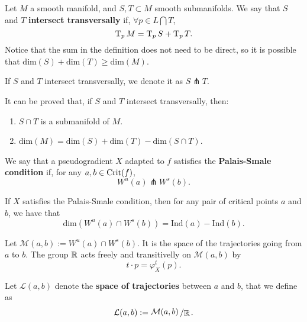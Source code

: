 \begin{deff}
Let $M$ a smooth manifold, and $S, T \subset M$ smooth submanifolds. We say that $S$ and $T$ {\bf intersect transversally} if, $\forall p \in L \bigcap T$,
$$\operatorname T_pM = \operatorname T_pS + \operatorname T_pT .$$
Notice that the sum in the definition does not need to be direct, so it is possible that $\text{dim}(S)+\text{dim}(T) \geq \text{dim}(M)$.

If $S$ and $T$ intersect transversally, we denote it as $S \pitchfork T$.
\end{deff}

It can be proved that, if $S$ and $T$ intersect transversally, then:

\begin{enumerate}
	\item $S \cap T$ is a submanifold of $M$.
	\item $\text{dim}(M) = \text{dim}(S) + \text{dim}(T) - \text{dim}(S \cap T)$.
\end{enumerate}

\begin{deff}
We say that a pseudogradient $X$ adapted to $f$ satisfies the {\bf Palais-Smale condition} if, for any $a,b \in \text{Crit}(f)$,
$$W^u(a) \pitchfork W^s(b) .$$
\end{deff}

\begin{rmrk}
If $X$ satisfies the Palais-Smale condition, then for any pair of critical points $a$ and $b$, we have that
\begin{equation} \label{eq:dimIntersect}
\text{dim}(W^u(a) \cap W^s(b)) = \text{Ind}(a) - \text{Ind}(b) .
\end{equation}
\end{rmrk}


Let $\mathcal{M}(a,b) := W^u(a) \cap W^s(b)$. It is the space of the trajectories going from $a$ to $b$. The group $\mathbb{R}$ acts freely and transitivelly on $\mathcal{M}(a,b)$ by
\begin{displaymath}
t \cdot p = \varphi_X^t(p) .
\end{displaymath}

\begin{deff}
Let $\mathcal{L}(a,b)$ denote the {\bf space of trajectories} between $a$ and $b$, that we define as
\begin{displaymath}
\mathcal{L}(a,b) := \quocient{\mathcal{M}(a,b)}{\R} .
\end{displaymath}
\end{deff}

